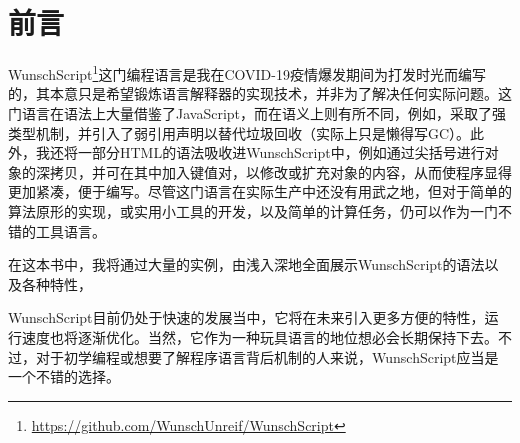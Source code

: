 \chapter{前言}

WunschScript\footnote{\url{https://github.com/WunschUnreif/WunschScript}}这门编程语言是我在COVID-19疫情爆发期间为打发时光而编写的，其本意只是希望锻炼语言解释器的实现技术，并非为了解决任何实际问题。这门语言在语法上大量借鉴了JavaScript，而在语义上则有所不同，例如，采取了强类型机制，并引入了弱引用声明以替代垃圾回收（实际上只是懒得写GC）。此外，我还将一部分HTML的语法吸收进WunschScript中，例如通过尖括号进行对象的深拷贝，并可在其中加入键值对，以修改或扩充对象的内容，从而使程序显得更加紧凑，便于编写。尽管这门语言在实际生产中还没有用武之地，但对于简单的算法原形的实现，或实用小工具的开发，以及简单的计算任务，仍可以作为一门不错的工具语言。

\par 
在这本书中，我将通过大量的实例，由浅入深地全面展示WunschScript的语法以及各种特性，

\par 

WunschScript目前仍处于快速的发展当中，它将在未来引入更多方便的特性，运行速度也将逐渐优化。当然，它作为一种玩具语言的地位想必会长期保持下去。不过，对于初学编程或想要了解程序语言背后机制的人来说，WunschScript应当是一个不错的选择。
